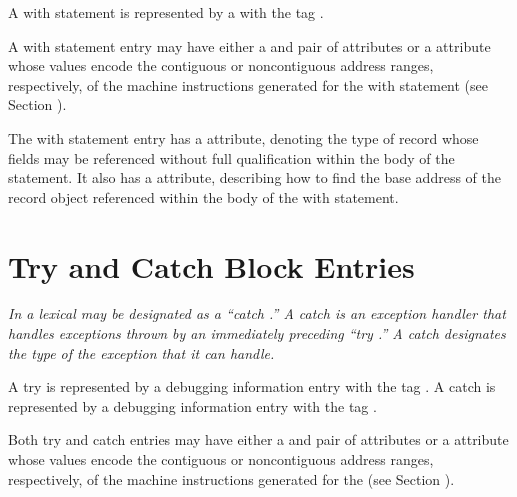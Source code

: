 A with statement is represented by a
with the tag .

A with statement entry may have either a 
 and
 pair of attributes 
or 
a  attribute
whose values encode the contiguous or non\dash contiguous address
ranges, respectively, of the machine instructions generated
for the with statement 
(see Section ).

The with statement entry has 
a  attribute, denoting
the type of record whose fields may be referenced without full
qualification within the body of the statement. It also has
a  attribute, describing how to find the base
address of the record object referenced within the body of
the with statement.

\section{Try and Catch Block Entries}
\label{chap:tryandcatchblockentries}

\textit{In  a lexical  may be 
designated as a ``catch .'' 
A catch  is an 
exception handler that handles
exceptions thrown by an immediately 
preceding ``try .''
A catch  
designates the type of the exception that it
can handle.}

A try  is represented 
by a debugging information entry
with the tag .  
A catch  is represented by
a debugging information entry with 
the tag .

Both try and catch  entries may have either a
 and 
 pair of attributes 
or 
a
 attribute 
whose values encode the contiguous
or non\dash contiguous address ranges, respectively, of the
machine instructions generated for the 
(see Section
).

